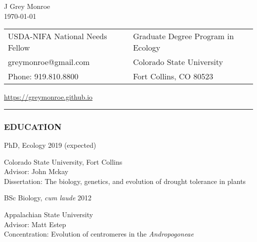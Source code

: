 \documentclass[12pt,english]{article}
\providecommand{\tabularnewline}{\\}
\begin{document}
\begin {center}
{\huge J Grey Monroe}\tabularnewline
\today

\vspace{1em}

\begin{tabular}{>{\raggedright}p{3in}>{\raggedleft}p{3in}}
USDA-NIFA National Needs Fellow & Graduate Degree Program in Ecology\tabularnewline
 greymonroe@gmail.com &  Colorado State University \tabularnewline
Phone: 919.810.8800 & Fort Collins, CO 80523\tabularnewline
\end{tabular}
\href{https://greymonroe.github.io}{https://greymonroe.github.io}
\end{center}
\vspace{-1em}

\rule[0.5ex]{1\columnwidth}{0.5pt}


\subsubsection*{EDUCATION}
\vspace{-0.5ex}

\hspace{1.0em} PhD, Ecology
\hfill 
2019 (expected)
\par
\hspace*{2.0em} Colorado State University, Fort Collins \\
\hspace*{2.0em} Advisor: John Mckay \\
\hspace*{2.0em} Dissertation: The biology, genetics, and evolution of drought tolerance in plants 
\\
\vspace{-0.5ex}\par

\hspace{1.0em} BSc Biology, \emph{cum laude}  
\hfill
2012
\par
\hspace*{2.0em} Appalachian State University \\
\hspace*{2.0em} Advisor: Matt Estep \\
\hspace*{2.0em} Concentration: Evolution of centromeres in the \textit{Andropogoneae} \\
\end{document}
